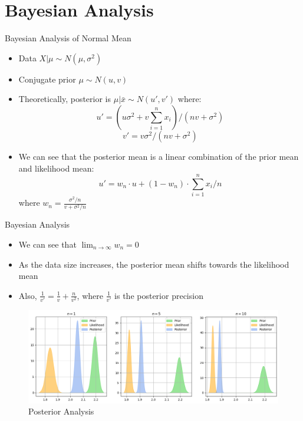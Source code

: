 \section{Bayesian Analysis}

\begin{frame}{Bayesian Analysis of Normal Mean}

  \begin{itemize}
    \item Data $X | \mu \sim N(\mu, \sigma^2)$
    \item Conjugate prior $\mu \sim N(u, v)$
    \item Theoretically, posterior is $\mu | \bar{x} \sim N(u', v')$ where:
    \[ u' = \left(u \sigma^2 + v \sum_{i = 1}^{n} x_i\right) / (n v + \sigma^2) \]
    \[ v' = v \sigma^2/(n v + \sigma^2) \]
    \item We can see that the posterior mean is a linear combination of the prior mean and likelihood mean:
    \[ u' = w_n \cdot u + (1 - w_n) \cdot \sum_{i = 1}^{n} x_i / n \]
    where $w_n = \frac{\sigma^2 / n}{v + \sigma^2 / n}$
  \end{itemize}
  
\end{frame}

\begin{frame}{Bayesian Analysis}

  \begin{itemize}
    \item We can see that $\lim_{n \to \infty} w_n = 0$
    \item As the data size increases, the posterior mean shifts towards the likelihood mean
    \item Also, $\frac{1}{v'} = \frac{1}{v} + \frac{n}{v^2}$, where $\frac{1}{v'}$ is the posterior precision
  \end{itemize}

  \begin{figure}
    \centering
    \includegraphics[width=\textwidth]{../Report/images/posterior.png}
    \caption{Posterior Analysis}
  \end{figure}

\end{frame}

